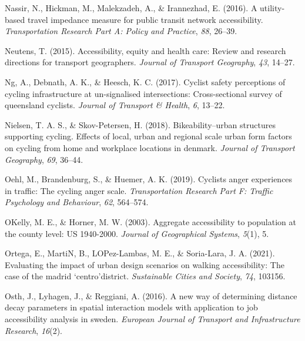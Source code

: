 \documentclass[
11pt, %
oneside, %
english, %
singlespacing, %
]{macthesis} %
\newlength{\cslhangindent}
\newenvironment{CSLReferences}[2] %
 {%
  \setlength{\parindent}{0pt}
  \ifodd #1 \everypar{\setlength{\hangindent}{\cslhangindent}}\ignorespaces\fi
  \ifnum #2 > 0
  \setlength{\parskip}{#2\baselineskip}
  \fi
 }%
 {}
\begin{document}
\begin{CSLReferences}{1}{0}
\leavevmode{}%
Nassir, N., Hickman, M., Malekzadeh, A., \& Irannezhad, E. (2016). A utility-based travel impedance measure for public transit network accessibility. \emph{Transportation Research Part A: Policy and Practice}, \emph{88}, 26--39.

\leavevmode{}%
Neutens, T. (2015). Accessibility, equity and health care: Review and research directions for transport geographers. \emph{Journal of Transport Geography}, \emph{43}, 14--27.

\leavevmode{}%
Ng, A., Debnath, A. K., \& Heesch, K. C. (2017). Cyclist safety perceptions of cycling infrastructure at un-signalised intersections: Cross-sectional survey of queensland cyclists. \emph{Journal of Transport \& Health}, \emph{6}, 13--22.

\leavevmode{}%
Nielsen, T. A. S., \& Skov-Petersen, H. (2018). Bikeability--urban structures supporting cycling. Effects of local, urban and regional scale urban form factors on cycling from home and workplace locations in denmark. \emph{Journal of Transport Geography}, \emph{69}, 36--44.

\leavevmode{}%
Oehl, M., Brandenburg, S., \& Huemer, A. K. (2019). Cyclists anger experiences in traffic: The cycling anger scale. \emph{Transportation Research Part F: Traffic Psychology and Behaviour}, \emph{62}, 564--574.

\leavevmode{}%
OKelly, M. E., \& Horner, M. W. (2003). Aggregate accessibility to population at the county level: US 1940-2000. \emph{Journal of Geographical Systems}, \emph{5}(1), 5.

\leavevmode{}%
Ortega, E., MartiN, B., LOPez-Lambas, M. E., \& Soria-Lara, J. A. (2021). Evaluating the impact of urban design scenarios on walking accessibility: The case of the madrid `centro'district. \emph{Sustainable Cities and Society}, \emph{74}, 103156.

\leavevmode{}%
Osth, J., Lyhagen, J., \& Reggiani, A. (2016). A new way of determining distance decay parameters in spatial interaction models with application to job accessibility analysis in sweden. \emph{European Journal of Transport and Infrastructure Research}, \emph{16}(2).


\end{CSLReferences}
\end{document}
